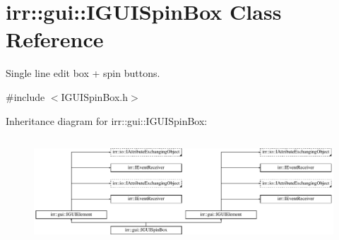 \hypertarget{classirr_1_1gui_1_1IGUISpinBox}{}\section{irr\+:\+:gui\+:\+:I\+G\+U\+I\+Spin\+Box Class Reference}
\label{classirr_1_1gui_1_1IGUISpinBox}


Single line edit box + spin buttons.  




{\ttfamily \#include $<$I\+G\+U\+I\+Spin\+Box.\+h$>$}

Inheritance diagram for irr\+:\+:gui\+:\+:I\+G\+U\+I\+Spin\+Box\+:\begin{figure}[H]
\begin{center}
\leavevmode
\includegraphics[height=4.038462cm]{classirr_1_1gui_1_1IGUISpinBox}
\end{center}
\end{figure}
